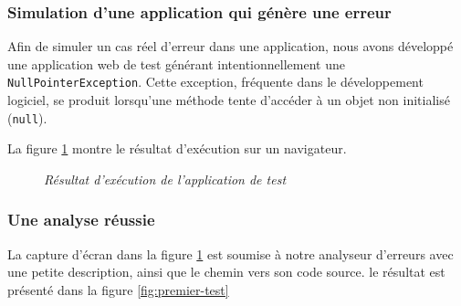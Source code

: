 \documentclass[12pt,a4paper]{report}
\begin{document}
	
	\subsubsection{Simulation d'une application qui génère une erreur}
	
	Afin de simuler un cas réel d'erreur dans une application, nous avons développé une application web de test générant intentionnellement une \verb|NullPointerException|. Cette exception, fréquente dans le développement logiciel, se produit lorsqu'une méthode tente d'accéder à un objet non initialisé (\verb|null|).
	
	La figure \ref{fig:simulation-erreur} montre le résultat d'exécution sur un navigateur.
	
	\begin{figure}[H]
		\centering
		\caption{\textit{Résultat d'exécution de l'application de test}}
		\label{fig:simulation-erreur}
	\end{figure}
	
	\subsubsection{Une analyse réussie}
	
	La capture d'écran dans la figure \ref{fig:simulation-erreur} est soumise à notre analyseur d'erreurs avec une petite description, ainsi que le chemin vers son code source. le résultat est présenté dans la figure \ref{fig:premier-test}
	
\end{document}
